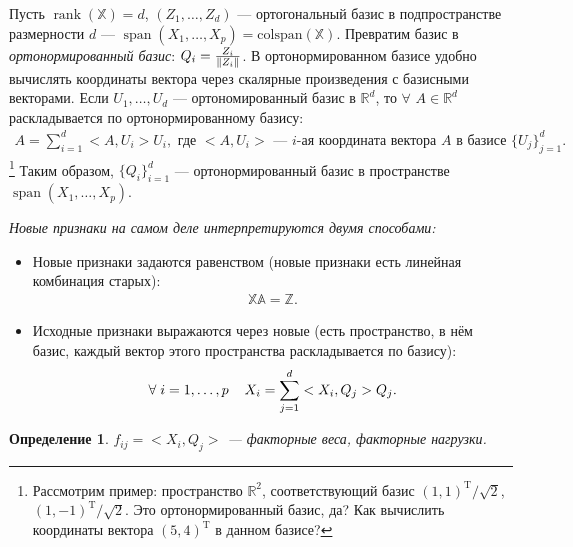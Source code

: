 \documentclass[specialist, 12pt,
subf, %
href, colorlinks=true,
substylefile = spbu.rtx,
]{disser}
\newtheorem{definition}{Определение}
\DeclareMathOperator{\spn}{span}
\DeclareMathOperator{\rnk}{rank}
\begin{document}
Пусть $\rnk(\mathbb{X}) = d$, $(Z_1, \ldots, Z_d)$ --- ортогональный базис в подпространстве размерности $d$ --- $\spn(X_1, \ldots, X_p) = \mathrm{colspan}(\mathbb{X})$.
Превратим базис в \textit{ортонормированный базис}: $Q_i = \frac{Z_i}{\Arrowvert Z_i\Arrowvert}$. В ортонормированном базисе удобно вычислять координаты вектора через скалярные произведения с базисными векторами.
Если $U_1, \ldots, U_d$ --- ортономированный базис в $\mathbb{R}^d$, то $\forall$ $A \in \mathbb{R}^d$ раскладывается по ортонормированному базису:
\begin{gather*}
A = \sum\limits_{i = 1}^d <A, U_i> U_i, \text{ где $<A, U_i>$ --- $i$-ая координата вектора $A$ в базисе $\{U_j\}_{j = 1}^d$.}
\end{gather*}
 \footnote{Рассмотрим пример: пространство $\mathbb{R}^2$, соответствующий базис $(1,1)^{\mathrm{T}}/\sqrt{2}$, $(1,-1)^{\mathrm{T}}/\sqrt{2}$. Это ортонормированный базис, да? Как вычислить координаты вектора $(5, 4)^{\mathrm{T}}$ в данном базисе?
}
 Таким образом, $\{Q_i\}_{i=1}^d$ --- ортонормированный базис в пространстве $\spn(X_1, \ldots, X_p)$.


\textit{Новые признаки на самом деле интерпретируются двумя способами:}
\begin{itemize}
	\item Новые признаки задаются равенством (новые признаки есть линейная комбинация старых):
	\begin{gather*}
	\mathbb{X}\mathbb{A} = \mathbb{Z}.
	\end{gather*}
	\item Исходные признаки выражаются через новые (есть пространство, в нём базис, каждый вектор этого пространства раскладывается по базису):
	\begin{gather}\label{1}
	\forall \hspace{0.1 cm} i = 1,\ldots,p \hspace{0.4 cm} X_i = \sum\limits_{j = 1}^d <X_i, Q_j> Q_j.
	\end{gather}
\end{itemize}
\begin{definition}
	$f_{ij} = <X_i, Q_j>$ --- факторные веса, факторные нагрузки.
\end{definition}

\end{document}
